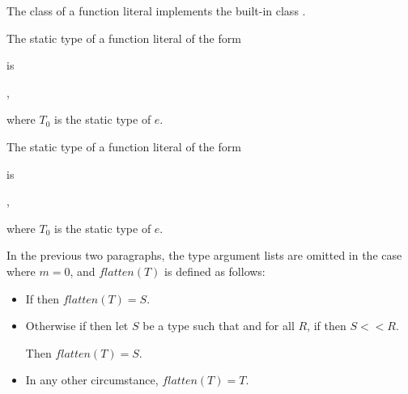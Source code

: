 \documentclass{article}
\begin{document}
\LMHash{}
The class of a function literal implements the built-in class \FUNCTION{}.

\LMHash{}
The static type of a function literal of the form



\noindent
is

,

\noindent
where $T_0$ is the static type of $e$.

\LMHash{}
The static type of a function literal of the form



\noindent
is


,

\noindent
where $T_0$ is the static type of $e$.

\LMHash{}
In the previous two paragraphs, the type argument lists are omitted in the case where $m = 0$, and $flatten(T)$ is defined as follows:

\begin{itemize}
\item If  then $flatten(T) = S$.

\item Otherwise if
then let $S$ be a type such that
and for all $R$, if
then $S << R$.


Then $flatten(T) = S$.

\item In any other circumstance, $flatten(T) = T$.
\end{itemize}
\end{document}
